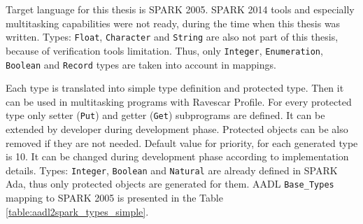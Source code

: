 Target language for this thesis is SPARK 2005. SPARK 2014 tools and especially multitasking capabilities were not ready, during the time when this thesis was written. Types: \lstinline{Float}, \lstinline{Character} and \lstinline{String} are also not part of this thesis, because of verification tools limitation. Thus, only \lstinline{Integer}, \lstinline{Enumeration}, \lstinline{Boolean} and \lstinline{Record} types are taken into account in mappings.

Each type is translated into simple type definition and protected type. Then it can be used in multitasking programs with Ravescar Profile. For every protected type only setter (\lstinline{Put}) and getter (\lstinline{Get}) subprograms are defined. It can be extended by developer during development phase. Protected objects can be also removed if they are not needed. Default value for priority, for each generated type is 10. It can be changed during development phase according to implementation details. Types: \lstinline{Integer}, \lstinline{Boolean} and \lstinline{Natural} are already defined in SPARK Ada, thus only protected objects are generated for them. AADL \lstinline{Base_Types} mapping to SPARK 2005 is presented in the Table \ref{table:aadl2spark_types_simple}.

